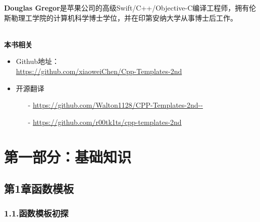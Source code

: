 \documentclass[11pt,a4paper,UTF8]{book}
\begin{document}
\begin{sloppypar}
	\textbf{Douglas Gregor}是苹果公司的高级Swift/C++/Objective-C编译工程师，拥有伦斯勒理工学院的计算机科学博士学位，并在印第安纳大学从事博士后工作。
	
	\hspace*{\fill} \\ %
	\noindent\textbf{本书相关}
	\begin{itemize}
		\item Github地址：\\\url{https://github.com/xiaoweiChen/Cpp-Templates-2nd}
		\item 开源翻译
		\begin{itemize}
			\item[-]
			\url{https://github.com/Walton1128/CPP-Templates-2nd--}
			\item[-]
			\url{https://github.com/r00tk1ts/cpp-templates-2nd}
		\end{itemize}
	\end{itemize}
	\newpage
	
	\pagestyle{empty}
	
	\newpage
	
	\pagestyle{empty}
	
	\newpage
	
	\pagestyle{empty}
	
	\newpage
	
	\pagestyle{empty}
	
	\newpage
	
	\tableofcontents
	\newpage

	
	\color{white}
	\section*{第一部分：基础知识}
	\pagecolor{mygray}
	\textbf{}
	\newpage
	\color{black}
	\pagecolor{white}

	\subsection*{ 第1章\hspace{0.5cm}函数模板}
	
	
	\subsubsection*{ 1.1.\hspace{0.2cm}函数模板初探}
	
	

\end{sloppypar}
\end{document}
